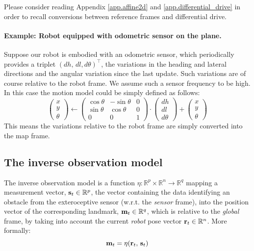 		Please consider reading Appendix \ref{app.affine2d} and \ref{app.differential_drive} in order to recall conversions between reference frames and differential drive.
		
	\paragraph{Example: Robot equipped with odometric sensor on the plane.}
		Suppose our robot is embodied with an odometric sensor, which periodically provides a triplet $(dh,\, dl, d\theta)^\top$, \ie{} the variations in the heading and lateral directions and the angular variation since the last update. 
		Such variations are of course relative to the robot frame.
		We assume such a sensor frequency to be high.
		In this case the motion model could be simply defined as follows:
		\begin{equation}
			\label{eq.motion.odometrix}
			\left(\begin{array}{c}
				x \\ y \\ \theta
			\end{array}\right)
			\leftarrow
			\left(\begin{array}{ccc}
				\cos{\theta} & -\sin{\theta} & 0 \\
				\sin{\theta} & \cos{\theta} & 0 \\
				0 & 0 & 1
			\end{array}\right)
			\cdot
			\left(\begin{array}{c}
				dh \\
				dl \\
				d\theta
			\end{array}\right)
			+
			\left(\begin{array}{c}
				x \\ y \\ \theta
			\end{array}\right)
		\end{equation}
		This means the variations relative to the robot frame are simply converted into the map frame.

\subsection{The inverse observation model}
	The inverse observation model is a function $\eta : \mathbb{R}^p \times \mathbb{R}^n \rightarrow \mathbb{R}^q$ mapping a measurement vector, $\boldsymbol{\mathrm{{s}}}_{t} \in \mathbb{R}^p$, \ie{} the vector containing the data identifying an obstacle from the exteroceptive sensor (w.r.t. the \emph{sensor} frame), into the position vector of the corresponding landmark, $\boldsymbol{\mathrm{{m}}}_{t} \in \mathbb{R}^q$, which is relative to the \emph{global} frame, by taking into account the current \emph{robot} pose vector $\boldsymbol{\mathrm{{r}}}_t \in \mathbb{R}^n$.
	More formally:
	\[
	\boldsymbol{\mathrm{{m}}}_t = \eta(\boldsymbol{\mathrm{{r}}}_{t},\, \boldsymbol{\mathrm{{s}}}_t)
	\]
	
